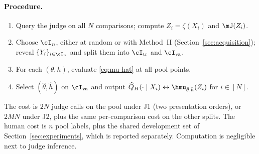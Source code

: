\paragraph{Procedure.}
\begin{enumerate}[label=\arabic*.]
  \item Query the judge on all $N$ comparisons; compute $Z_i=\zeta(X_i)$ and $\mJ(Z_i)$.
  \item Choose $\cI_n$, either at random or with Method~II (Section~\ref{sec:acquisition}); reveal
        $\{Y_i\}_{i\in\cI_n}$ and split them into $\cI_{\mathrm{tr}}$ and $\cI_{\mathrm{va}}$.
  \item For each $(\theta,h)$, evaluate \eqref{eq:mu-hat} at all pool points.
  \item Select $(\hat\theta,\hat h)$ on $\cI_{\mathrm{va}}$ and output
        $\widehat Q_H(\cdot\mid X_i)\leftrightarrow\hmu_{\hat\theta,\hat h}(Z_i)$ for $i\in[N]$.
\end{enumerate}
The cost is $2N$ judge calls on the pool under J1 (two presentation orders), or $2MN$ under J2, plus
the same per-comparison cost on the other splits. The human cost is $n$ pool labels, plus the
shared development set of Section~\ref{sec:experiments}, which is reported separately.
Computation is negligible next to judge inference.
